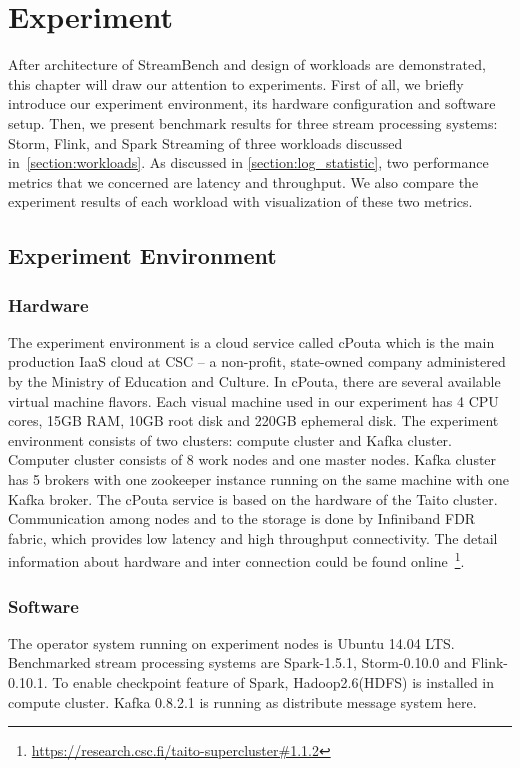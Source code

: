 \chapter{Experiment}
\label{chapter:experiment}

After architecture of StreamBench and design of workloads are demonstrated, this chapter will draw our attention to experiments. First of all, we briefly introduce our experiment environment, its hardware configuration and software setup. Then, we present benchmark results for three stream processing systems: Storm, Flink, and Spark Streaming of three workloads discussed in~\cref{section:workloads}. As discussed in \cref{section:log_statistic}, two performance metrics that we concerned are latency and throughput. We also compare the experiment results of each workload with visualization of these two metrics. 

\section{Experiment Environment}

\label{section:cpouta}
\subsection{Hardware}

The experiment environment is a cloud service called cPouta which is the main production IaaS cloud at CSC -- a non-profit, state-owned company administered by the Ministry of Education and Culture. In cPouta,  there are several available virtual machine flavors. Each visual machine used in our experiment has 4 CPU cores, 15GB RAM, 10GB root disk and 220GB ephemeral disk. The experiment environment consists of two clusters: compute cluster and Kafka cluster. Computer cluster consists of 8 work nodes and one master nodes. Kafka cluster has 5 brokers with one zookeeper instance running on the same machine with one Kafka broker. The cPouta service is based on the hardware of the Taito cluster. Communication among nodes and to the storage is done by Infiniband FDR fabric, which provides low latency and high throughput connectivity. The detail information about hardware and inter connection could be found online~\footnote{\url{https://research.csc.fi/taito-supercluster\#1.1.2}}.

\subsection{Software}
The operator system running on experiment nodes is Ubuntu 14.04 LTS. Benchmarked stream processing systems are Spark-1.5.1, Storm-0.10.0 and Flink-0.10.1. To enable checkpoint feature of Spark, Hadoop2.6(HDFS) is installed in compute cluster. Kafka 0.8.2.1 is running as distribute message system here.

